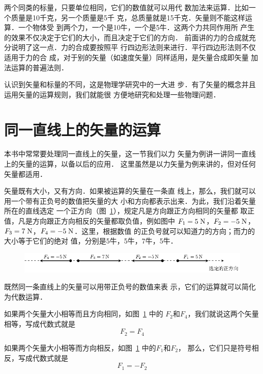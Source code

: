     两个同类的标量，只要单位相同，它们的数值就可以用代
数加法来运算．比如一个质量是10千克，另一个质量是5千
克，总质量就是15千克．矢量则不能这样运算．一个物体受
到两个力，一个是10牛，一个是5牛．这两个力共同作用所
产生的效果不仅决定于它们的大小，而且决定于它们的方向．
前面讲的力的合成就充分说明了这一点．力的合成要按照平
行四边形法则来进行．平行四边形法则不仅适用于力的合
成，对于别的矢量（如速度矢量）同样适用，是矢量合成即矢量
加法运算的普遍法则．

    认识到矢量和标量的不同，这是物理学研究中的一大进
步．有了矢量的概念并且运用矢量的运算规则，我们就能很
方便地研究和处理一些物理问题．

\section{同一直线上的矢量的运算} 
    本书中常常要处理同一直线上的矢量，这一节我们以力
矢量为例讲一讲同一直线上的矢量的运算，以备以后的应用．
这里虽然是以力矢量为例来讲的，但对任何矢量都适用．

    矢量既有大小，又有方向．如果被运算的矢量在一条直
线上，那么，我们就可以用一个带有正负号的数值把矢量的大
小和方向都表示出来．为此，我们沿着矢量所在的直线选定
一个正方向（图~\ref{fig_A_1-33}），规定凡是方向跟正方向相同的矢量都
取正值，凡是方向跟正方向相反的矢量都取负值，例如图中
$F_1=5 \;\text{N} $，$F_2=-5 \;\text{N} $，$F_3=7 \;\text{N} $，$F_4=-5 \;\text{N} $．这里，根据数值
的正负号就可以知道力的方向；而力的大小等于它们的绝对
值，分别是5牛，5牛，7牛，5牛．

\begin{figure}[htbp]
    \centering
    \includegraphics{fig/A/1-33.pdf} 
    \caption{} \label{fig_A_1-33} 
\end{figure} 

既然同一条直线上的矢量可以用带正负号的数值来表
示，它们的运算就可以简化为代数运算．

    如果两个矢量大小相等而且方向相同，如图~\ref{fig_A_1-33} 中的
$F_2$和$F_4$，我们就说这两个矢量相等，写成代数式就是
\begin{equation} 
F_2=F_4
\end{equation} 

    如果两个矢量大小相等而方向相反，如图~\ref{fig_A_1-33} 中的$F_1$和$F_2$，
那么，它们只是符号相反，写成代数式就是
\begin{equation} 
F_1=-F_2
\end{equation} 

